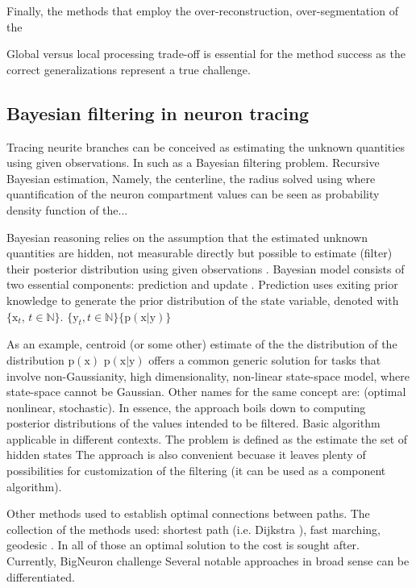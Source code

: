 %
Finally, the methods that employ the over-reconstruction, over-segmentation of the 

 

Global versus local processing trade-off is essential for the method success as the correct generalizations represent a true challenge.

\subsection{Bayesian filtering in neuron tracing}
Tracing neurite branches can be conceived as estimating the unknown quantities using given observations. In such  as a Bayesian filtering problem. Recursive Bayesian estimation,  Namely, the centerline, the radius solved using  where quantification of the neuron compartment values can be seen as probability density function of the... 

Bayesian reasoning relies on the assumption that the estimated unknown quantities are hidden, not measurable directly but possible to estimate (filter) their posterior distribution using given observations \cite{doucet2001introduction}. Bayesian model consists of two essential components: prediction and update \cite{ristic2004beyond}. Prediction uses exiting prior knowledge to generate the prior distribution  of the state variable, denoted with $ \{ \mathrm{x}_t $, $ t \in \mathbb{N} \} $.  $ \{ \mathrm{y}_t, t \in \mathbb{N} \} \{ \mathrm{p}(\mathrm{x} | \mathrm{y}) \} $ 

As an example, centroid (or some other) estimate of the the distribution of the distribution $\mathrm{p}(\mathrm{x})$  $\mathrm{p}(\mathrm{x} | \mathrm{y})$
offers a common generic solution for tasks that involve non-Gaussianity, high dimensionality, non-linear state-space model, where state-space cannot be Gaussian. Other names for the same concept are: (optimal nonlinear, stochastic). In essence, the approach boils down to computing posterior distributions of the values intended to be filtered. Basic algorithm applicable in different contexts. The problem is defined as the estimate the set of hidden states The approach is also convenient becuase it leaves plenty of possibilities for customization of the filtering (it can be used as a component algorithm).

Other methods used to establish optimal connections between paths.
The collection of the methods used: shortest path (i.e. Dijkstra \cite{dijkstra1959note}), fast marching, geodesic . In all of those an optimal solution to the cost is sought after. Currently, BigNeuron challenge Several notable approaches in broad sense can be differentiated.

